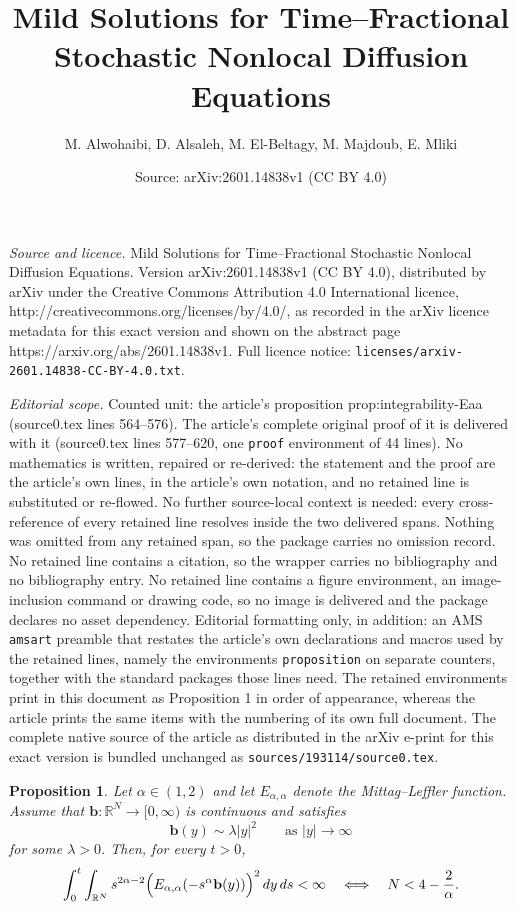 \documentclass[10pt,a4paper]{amsart}
\title{Mild Solutions for Time--Fractional Stochastic Nonlocal Diffusion Equations}
\author{M. Alwohaibi, D. Alsaleh, M. El-Beltagy, M. Majdoub, E. Mliki}
\date{Source: arXiv:2601.14838v1 (CC BY 4.0)}
\newtheorem{proposition}{Proposition}
\newcommand{\R}{\ensuremath{\mathbb{R}}}
\begin{document}
\maketitle

\noindent\emph{Source and licence.} Mild Solutions for Time--Fractional Stochastic Nonlocal Diffusion Equations. Version arXiv:2601.14838v1 (CC BY 4.0), distributed by arXiv under the Creative Commons Attribution 4.0 International licence, http://creativecommons.org/licenses/by/4.0/, as recorded in the arXiv licence metadata for this exact version and shown on the abstract page https://arxiv.org/abs/2601.14838v1. Full licence notice: \texttt{licenses/arxiv-2601.14838-CC-BY-4.0.txt}.\par\smallskip

\noindent\textit{Editorial scope.} Counted unit: the article's proposition prop:integrability-Eaa (source0.tex lines 564--576). The article's complete original proof of it is delivered with it (source0.tex lines 577--620, one \texttt{proof} environment of 44 lines). No mathematics is written, repaired or re-derived: the statement and the proof are the article's own lines, in the article's own notation, and no retained line is substituted or re-flowed.  No further source-local context is needed: every cross-reference of every retained line resolves inside the two delivered spans.  Nothing was omitted from any retained span, so the package carries no omission record.  No retained line contains a citation, so the wrapper carries no bibliography and no bibliography entry.  No retained line contains a figure environment, an image-inclusion command or drawing code, so no image is delivered and the package declares no asset dependency.  Editorial formatting only, in addition: an AMS \texttt{amsart} preamble that restates the article's own declarations and macros used by the retained lines, namely the environments \texttt{proposition} on separate counters, together with the standard packages those lines need.  The retained environments print in this document as Proposition 1 in order of appearance, whereas the article prints the same items with the numbering of its own full document.  The complete native source of the article as distributed in the arXiv e-print for this exact version is bundled unchanged as \texttt{sources/193114/source0.tex}.
\begin{proposition}\label{prop:integrability-Eaa}
Let $\alpha\in(1,2)$ and let $E_{\alpha,\alpha}$ denote the Mittag--Leffler function.
Assume that $\mathbf b:\R^N\to[0,\infty)$ is continuous and satisfies
\begin{equation}\label{eq:b-asympt}
\mathbf b(y)\sim \lambda |y|^2 \qquad \text{as } |y|\to\infty
\end{equation}
for some $\lambda>0$. Then, for every $t>0$,
\[
\int_0^t\int_{\R^N} s^{2\alpha-2}\Bigl(E_{\alpha,\alpha}(-s^\alpha \mathbf b(y))\Bigr)^2\,dy\,ds<\infty
\quad\Longleftrightarrow\quad
N<4-\frac{2}{\alpha}.
\]
\end{proposition}
\end{document}
